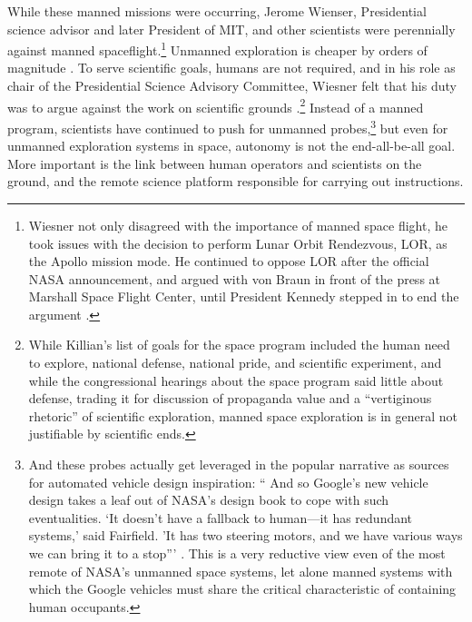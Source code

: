 While these manned missions were occurring, Jerome Wienser,
Presidential science advisor and later President of MIT, and other
scientists were perennially against manned
spaceflight.\footnote{Wiesner not only disagreed with the importance
  of manned space flight, he took issues with the decision to perform
  Lunar Orbit Rendezvous, LOR, as the Apollo mission mode. He
  continued to oppose LOR after the official NASA announcement, and
  argued with von Braun in front of the
  press at Marshall Space Flight Center, until President Kennedy
  stepped in to end the argument \cite[p. 43]{Seamans}.} Unmanned exploration is
cheaper by orders of magnitude \cite[p. 66]{coxMurray}. To serve
scientific goals, humans are not required, and in his role as chair of
the Presidential Science Advisory Committee, Wiesner felt that his
duty was to argue against the work on scientific
grounds \cite[Chapter 2]{Levine}.\footnote{While Killian's list of goals for the
  space program included the human need to explore, national defense,
  national pride, and scientific experiment, and while the
  congressional hearings about the space program said little about
  defense, trading it for discussion of propaganda value and a
  ``vertiginous rhetoric'' of scientific exploration, manned space
  exploration is in general not justifiable by scientific ends\cite[p.
    194-197]{smithSelling}.} Instead of a manned program, scientists
have continued to push for unmanned probes,\footnote{And these probes
  actually get leveraged in the popular narrative as sources for
  automated vehicle design inspiration: `` And so Google's new vehicle
  design 
takes a leaf out of NASA's design book to cope with such
eventualities. `It doesn't have a fallback to human---it has redundant
systems,' said Fairfield. 'It has two steering motors, and we have
various ways we can bring it to a stop''' \cite{simonite}. This is a
very reductive view even of the most remote of NASA's unmanned space
systems, let alone manned systems with which the Google vehicles must share
the critical characteristic of containing human occupants.} but even for
unmanned exploration systems in space, autonomy is not the
end-all-be-all goal. More important is the link between human
operators and scientists on the ground, and the remote science
platform responsible for carrying out instructions. 

